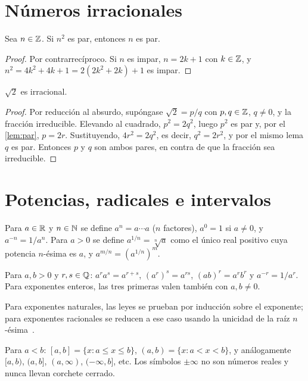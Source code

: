 \section{Números irracionales}

\begin{lema}\label{lem:par}
Sea $n\in\mathbb{Z}$. Si $n^2$ es par, entonces $n$ es par.
\end{lema}

\begin{proof}
Por contrarrecíproco. Si $n$ es impar, $n=2k+1$ con $k\in\mathbb{Z}$, y $n^2=4k^2+4k+1=2(2k^2+2k)+1$ es impar.
\end{proof}

\begin{teorema}\label{teo:raiz2}
$\sqrt2$ es irracional.
\end{teorema}

\begin{proof}
Por reducción al absurdo, supóngase $\sqrt2=p/q$ con $p,q\in\mathbb{Z}$, $q\neq0$, y la fracción irreducible. Elevando al cuadrado, $p^2=2q^2$, luego $p^2$ es par y, por el \cref{lem:par}, $p=2r$. Sustituyendo, $4r^2=2q^2$, es decir, $q^2=2r^2$, y por el mismo lema $q$ es par. Entonces $p$ y $q$ son ambos pares, en contra de que la fracción sea irreducible.
\end{proof}

\section{Potencias, radicales e intervalos}

Para $a\in\mathbb{R}$ y $n\in\mathbb{N}$ se define $a^n=a\cdots a$ ($n$ factores), $a^0=1$ si $a\neq 0$, y $a^{-n}=1/a^n$. Para $a>0$ se define $a^{1/n}=\sqrt[n]{a}$ como el único real positivo cuya potencia $n$-ésima es $a$, y $a^{m/n}=(a^{1/n})^m$.

\begin{proposicion}\label{prop:exponentes}
Para $a,b>0$ y $r,s\in\mathbb{Q}$: $a^{r}a^{s}=a^{r+s}$, $(a^{r})^{s}=a^{rs}$, $(ab)^{r}=a^{r}b^{r}$ y $a^{-r}=1/a^{r}$. Para exponentes enteros, las tres primeras valen también con $a,b\neq 0$.
\end{proposicion}

Para exponentes naturales, las leyes se prueban por inducción sobre el exponente; para exponentes racionales se reducen a ese caso usando la unicidad de la raíz $n$-ésima~\cite[§1.2--1.3]{openstax}.

\begin{definicion}[Intervalos]
Para $a<b$: $[a,b]=\{x: a\le x\le b\}$, $(a,b)=\{x: a<x<b\}$, y análogamente $[a,b)$, $(a,b]$, $(a,\infty)$, $(-\infty,b]$, etc. Los símbolos $\pm\infty$ no son números reales y nunca llevan corchete cerrado.
\end{definicion}

